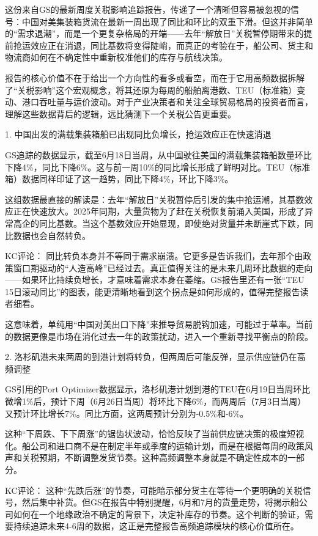 \documentclass[11pt]{ctexart}
\begin{document}
这份来自GS的最新周度关税影响追踪报告，传递了一个清晰但容易被忽视的信号：中国对美集装箱货流在最新一周出现了同比和环比的双重下滑。但这并非简单的“需求退潮”，而是一个更复杂格局的开端——去年“解放日”关税暂停期带来的提前抢运效应正在消退，同比基数将变得陡峭，而真正的考验在于，船公司、货主和物流商如何在不确定性中重新校准他们的库存与航线决策。

报告的核心价值不在于给出一个方向性的看多或看空，而在于它用高频数据拆解了“关税影响”这个宏观概念，将其还原为每周的船舶离港数、TEU（标准箱）变动、港口吞吐量与运价波动。对于产业决策者和关注全球贸易格局的投资者而言，理解这些数据背后的逻辑，远比猜测下一个关税公告更重要。

1. 中国出发的满载集装箱船已出现同比负增长，抢运效应正在快速消退

GS追踪的数据显示，截至6月18日当周，从中国驶往美国的满载集装箱船数量环比下降4\%，同比下降6\%。这与前一周10\%的同比增长形成了鲜明对比。TEU（标准箱）数据同样印证了这一趋势，同比下降4\%，环比下降3\%。

这组数据最直接的解读是：去年“解放日”关税暂停后引发的集中抢运潮，其基数效应正在快速放大。2025年同期，大量货物为了赶在关税恢复前涌入美国，形成了异常高企的同比基数。当这个基数效应开始显现，即使绝对货量并未断崖式下跌，同比数据也会自然转负。

KC评论： 同比转负本身并不等同于需求崩溃。它更多是告诉我们，去年那个由政策窗口期驱动的“人造高峰”已经过去。真正值得关注的是未来几周环比数据的走向——如果环比持续负增长，才意味着需求本身在萎缩。GS报告里还有一张“TEU 15日滚动同比”的图表，能更清晰地看到这个拐点是如何形成的，值得完整报告读者细看。

这意味着，单纯用“中国对美出口下降”来推导贸易脱钩加速，可能过于草率。当前的数据更像是市场在消化过去一年的政策扰动，进入一个重新寻找平衡点的阶段。

2. 洛杉矶港未来两周的到港计划将转负，但两周后可能反弹，显示供应链仍在高频调整

GS引用的Port Optimizer数据显示，洛杉矶港计划到港的TEU在6月19日当周环比微增1\%后，预计下周（6月26日当周）将环比下降6\%，而两周后（7月3日当周）又预计环比增长7\%。同比方面，这两周预计分别为-0.5\%和-6\%。

这种“下周跌、下下周涨”的锯齿状波动，恰恰反映了当前供应链决策的极度短视化。船公司和进口商不是在制定半年或季度的运输计划，而是在根据每周的政策风声和关税预期，不断调整发货节奏。这种高频调整本身就是不确定性成本的一部分。

KC评论： 这种“先跌后涨”的节奏，可能暗示部分货主在等待一个更明确的关税信号，然后集中补货。但GS在报告中特别提醒，6月和7月的货量走势，将揭示船公司如何在一个地缘政治不确定的背景下，决定补库存的节奏。这个判断的验证，需要持续追踪未来4-6周的数据，这正是完整报告高频追踪模块的核心价值所在。
\end{document}

